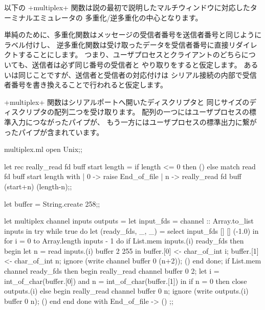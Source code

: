 \begin{example}
以下の \ml+multiplex+ 関数は説の最初で説明したマルチウィンドウに対応したターミナルエミュレータの
多重化/逆多重化の中心となります。

単純のために、多重化関数はメッセージの受信者番号を送信者番号と同じようにラベル付けし、
逆多重化関数は受け取ったデータを受信者番号に直接リダイレクトすることにします。
つまり、ユーザプロセスとクライアントのどちらについても、送信者は必ず同じ番号の受信者と
やり取りをすると仮定します。
あるいは同じことですが、送信者と受信者の対応付けは
シリアル接続の内部で受信者番号を書き換えることで行われると仮定します。

\ml+multiplex+ 関数はシリアルポートへ開いたディスクリプタと
同じサイズのディスクリプタの配列二つを受け取ります。
配列の一つにはユーザプロセスの標準入力につながったパイプが、
もう一方にはユーザプロセスの標準出力に繋がったパイプが含まれています。
%
\begin{listingcodefile}{multiplex.ml}
open Unix;;

let rec really_read fd buff start length =
  if length <= 0 then () else
    match read fd buff start length with
    | 0 -> raise End_of_file
    | n -> really_read fd buff (start+n) (length-n);;

let buffer = String.create 258;;

let multiplex channel inputs outputs =
  let input_fds = channel :: Array.to_list inputs in
  try
    while true do
      let (ready_fds, _, _) = select input_fds [] [] (-1.0) in
      for i = 0 to Array.length inputs - 1 do
        if List.mem inputs.(i) ready_fds then begin
          let n = read inputs.(i) buffer 2 255 in
          buffer.[0] <- char_of_int i;
          buffer.[1] <- char_of_int n;
          ignore (write channel buffer 0 (n+2));
          ()
        end
      done;
      if List.mem channel ready_fds then begin
        really_read channel buffer 0 2;
        let i = int_of_char(buffer.[0])
        and n = int_of_char(buffer.[1]) in
        if n = 0 then close outputs.(i) else
        begin
          really_read channel buffer 0 n;
          ignore (write outputs.(i) buffer 0 n);
          ()
        end
      end
    done
  with End_of_file -> () ;;
\end{listingcodefile}


\end{example}
